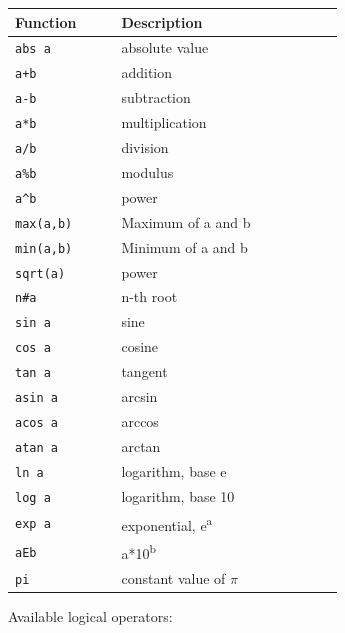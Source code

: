 \begin{center}
\vspace{0.3cm}
\begin{tabular}{|>{\raggedright} p{0.23\linewidth}| p{0.48\linewidth}|}
  \hline
  \rowcolor[HTML]{EFEFEF}
  Function & Description   \\
  \hline\hline
  {\tt abs a} & absolute value  \\
  \hline
  {\tt a+b} & addition \\
  \hline
  {\tt a-b} & subtraction \\
  \hline
  {\tt a*b} & multiplication \\
  \hline
  {\tt a/b} & division \\
  \hline
  {\tt a\%b} & modulus \\
  \hline
  {\tt a\^{}b} & power \\
  \hline
  {\tt max(a,b)} & Maximum of a and b \\
  \hline
  {\tt min(a,b)} & Minimum of a and b \\
  \hline
  {\tt sqrt(a)} & power \\
  \hline
  {\tt n\#a} & n-th root \\
  \hline
  {\tt sin a} & sine \\
  \hline
  {\tt cos a} & cosine \\
  \hline
  {\tt tan a} & tangent \\
  \hline
  {\tt asin a} & arcsin \\
  \hline
  {\tt acos a} & arccos \\
  \hline
  {\tt atan a} & arctan \\
  \hline
  {\tt ln a} & logarithm, base e \\
  \hline
  {\tt log a} & logarithm, base 10 \\
  \hline
  {\tt exp a} & exponential, e\textsuperscript{a} \\
  \hline
  {\tt aEb} & a*10\textsuperscript{b} \\
  \hline
  {\tt pi} & constant value of $\pi$ \\
\hline\end{tabular}
\end{center}

\clearpage
Available logical operators:

